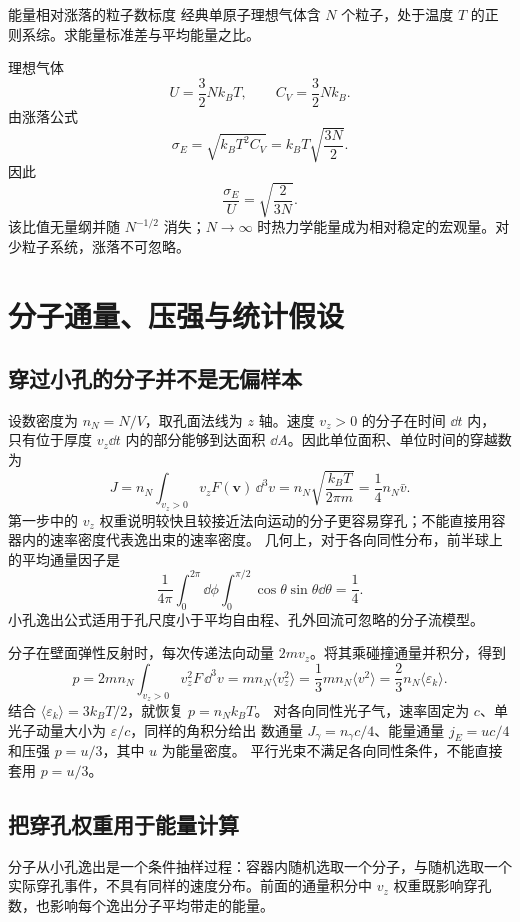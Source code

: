 \begin{origexamplebox}{能量相对涨落的粒子数标度}
经典单原子理想气体含 $N$ 个粒子，处于温度 $T$ 的正则系综。求能量标准差与平均能量之比。

\StatQFluctuation
\end{origexamplebox}
\begin{xesolution}
理想气体
\[
 U=\frac32Nk_BT,
 \qquad C_V=\frac32Nk_B.
\]
由涨落公式
\[
 \sigma_E=\sqrt{k_BT^2C_V}=k_BT\sqrt{\frac{3N}{2}}.
\]
因此
\[
 \boxed{\frac{\sigma_E}{U}=\sqrt{\frac{2}{3N}}}.
\]
该比值无量纲并随 $N^{-1/2}$ 消失；$N\to\infty$ 时热力学能量成为相对稳定的宏观量。对少粒子系统，涨落不可忽略。

\StatAFluctuation
\end{xesolution}

\section{分子通量、压强与统计假设}

\subsection{穿过小孔的分子并不是无偏样本}

设数密度为 $n_N=N/V$，取孔面法线为 $z$ 轴。速度 $v_z>0$ 的分子在时间 $\dd t$ 内，
只有位于厚度 $v_z\dd t$ 内的部分能够到达面积 $\dd A$。因此单位面积、单位时间的穿越数为
\[J=n_N\int_{v_z>0}v_z F(\boldsymbol v)\,\dd^3v
=n_N\sqrt{\frac{k_BT}{2\pi m}}=\frac14 n_N\bar v.\]
第一步中的 $v_z$ 权重说明较快且较接近法向运动的分子更容易穿孔；不能直接用容器内的速率密度代表逸出束的速率密度。
几何上，对于各向同性分布，前半球上的平均通量因子是
\[\frac1{4\pi}\int_0^{2\pi}\dd\phi\int_0^{\pi/2}\cos\theta\sin\theta\dd\theta=\frac14.\]
小孔逸出公式适用于孔尺度小于平均自由程、孔外回流可忽略的分子流模型。

分子在壁面弹性反射时，每次传递法向动量 $2mv_z$。将其乘碰撞通量并积分，得到
\[p=2mn_N\int_{v_z>0}v_z^2F\,\dd^3v
=mn_N\langle v_z^2\rangle
=\frac13mn_N\langle v^2\rangle=\frac23n_N\langle\varepsilon_k\rangle.\]
结合 $\langle\varepsilon_k\rangle=3k_BT/2$，就恢复 $p=n_Nk_BT$。
对各向同性光子气，速率固定为 $c$、单光子动量大小为 $\varepsilon/c$，同样的角积分给出
数通量 $J_\gamma=n_\gamma c/4$、能量通量 $j_E=uc/4$ 和压强 $p=u/3$，其中 $u$ 为能量密度。
平行光束不满足各向同性条件，不能直接套用 $p=u/3$。

\subsection{把穿孔权重用于能量计算}
分子从小孔逸出是一个条件抽样过程：容器内随机选取一个分子，与随机选取一个实际穿孔事件，不具有同样的速度分布。前面的通量积分中 $v_z$ 权重既影响穿孔数，也影响每个逸出分子平均带走的能量。

